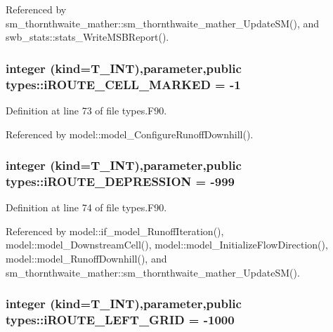 Referenced by sm\_\-thornthwaite\_\-mather::sm\_\-thornthwaite\_\-mather\_\-UpdateSM(), and swb\_\-stats::stats\_\-WriteMSBReport().

\hypertarget{namespacetypes_a42e13c9e6b0154abfab9212d6d7e6484}{
\subsubsection[{iROUTE\_\-CELL\_\-MARKED}]{\setlength{\rightskip}{0pt plus 5cm}integer (kind={\bf T\_\-INT}),parameter,public {\bf types::iROUTE\_\-CELL\_\-MARKED} = -\/1}}
\label{namespacetypes_a42e13c9e6b0154abfab9212d6d7e6484}


Definition at line 73 of file types.F90.



Referenced by model::model\_\-ConfigureRunoffDownhill().

\hypertarget{namespacetypes_af9ac3dcedd1cd95154ef3208d656a7cc}{
\subsubsection[{iROUTE\_\-DEPRESSION}]{\setlength{\rightskip}{0pt plus 5cm}integer (kind={\bf T\_\-INT}),parameter,public {\bf types::iROUTE\_\-DEPRESSION} = -\/999}}
\label{namespacetypes_af9ac3dcedd1cd95154ef3208d656a7cc}


Definition at line 74 of file types.F90.



Referenced by model::if\_\-model\_\-RunoffIteration(), model::model\_\-DownstreamCell(), model::model\_\-InitializeFlowDirection(), model::model\_\-RunoffDownhill(), and sm\_\-thornthwaite\_\-mather::sm\_\-thornthwaite\_\-mather\_\-UpdateSM().

\hypertarget{namespacetypes_ae4af15bc0a450716e8e45f1d550e1401}{
\subsubsection[{iROUTE\_\-LEFT\_\-GRID}]{\setlength{\rightskip}{0pt plus 5cm}integer (kind={\bf T\_\-INT}),parameter,public {\bf types::iROUTE\_\-LEFT\_\-GRID} = -\/1000}}
\label{namespacetypes_ae4af15bc0a450716e8e45f1d550e1401}


